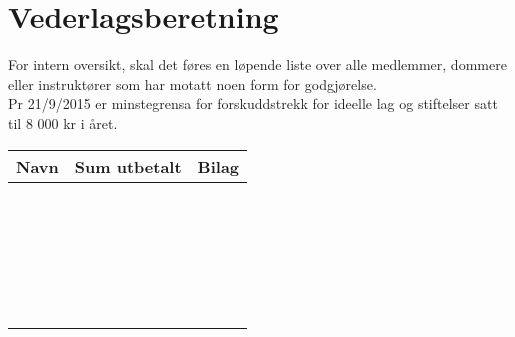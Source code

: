 \documentclass{article}
\begin{document}
\pagestyle{fancy}

\section*{Vederlagsberetning}
For intern oversikt, skal det føres en løpende liste over alle medlemmer, dommere eller instruktører som har motatt noen form for godgjørelse. \\
Pr 21/9/2015 er minstegrensa for forskuddstrekk for ideelle lag og stiftelser satt til 8 000 kr i året.


\begin{table}[h!]
\center


\begin{tabular}{| l | l | l | }
\hline
Navn \hspace{15em} & Sum utbetalt \hspace{12em} & Bilag \\
\hline

~  & ~ & \\
\hline
~ & ~ & \\
\hline
~ & ~ & \\
\hline
~ & ~ & \\
\hline
~ & ~ & \\
\hline


\end{tabular}
\end{table}
\end{document}

